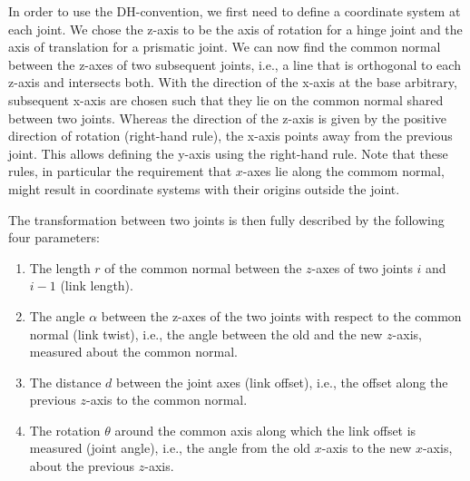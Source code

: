 
In order to use the DH-convention, we first need to define a coordinate system at each joint. We chose the z-axis to be the axis of rotation for a hinge joint and the axis of translation for a prismatic joint. We can now find the common normal between the z-axes of two subsequent joints, i.e., a line that is orthogonal to each z-axis and intersects both. With the direction of the x-axis at the base arbitrary, subsequent x-axis are chosen such that they lie on the common normal shared between two joints. Whereas the direction of the z-axis is given by the positive direction of rotation (right-hand rule), the x-axis points away from the previous joint. This allows defining the y-axis using the right-hand rule. Note that these rules, in particular the requirement that $x$-axes lie along the commom normal, might result in coordinate systems with their origins outside the joint. %

The transformation between two joints is then fully described by the following four parameters:
\begin{enumerate}
\item The length $ r$ of the common normal between the $z$-axes of two joints $i$ and $i-1$ (link length).
\item The angle $ \alpha$ between the z-axes of the two joints with respect to the common normal (link twist), i.e., the angle between the old and the new $z$-axis, measured about the common normal.
\item The distance $d$ between the joint axes (link offset), i.e., the offset along the previous $z$-axis to the common normal.
\item The rotation $ \theta$ around the common axis along which the link offset is measured (joint angle), i.e., the angle from the old $x$-axis to the new $x$-axis, about the previous $z$-axis.
\end{enumerate}

